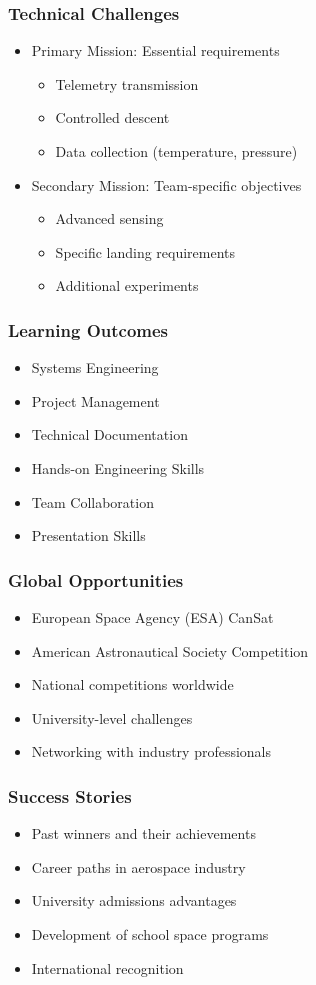 \documentclass{beamer}
\begin{document}
\begin{frame}
\frametitle{Technical Challenges}
\begin{itemize}
\item Primary Mission: Essential requirements
    \begin{itemize}
    \item Telemetry transmission
    \item Controlled descent
    \item Data collection (temperature, pressure)
    \end{itemize}
\item Secondary Mission: Team-specific objectives
    \begin{itemize}
    \item Advanced sensing
    \item Specific landing requirements
    \item Additional experiments
    \end{itemize}
\end{itemize}
\end{frame}

\begin{frame}
\frametitle{Learning Outcomes}
\begin{itemize}
\item Systems Engineering
\item Project Management
\item Technical Documentation
\item Hands-on Engineering Skills
\item Team Collaboration
\item Presentation Skills
\end{itemize}
\end{frame}

\begin{frame}
\frametitle{Global Opportunities}
\begin{itemize}
\item European Space Agency (ESA) CanSat
\item American Astronautical Society Competition
\item National competitions worldwide
\item University-level challenges
\item Networking with industry professionals
\end{itemize}
\end{frame}

\begin{frame}
\frametitle{Success Stories}
\begin{itemize}
\item Past winners and their achievements
\item Career paths in aerospace industry
\item University admissions advantages
\item Development of school space programs
\item International recognition
\end{itemize}
\end{frame}
\end{document}
